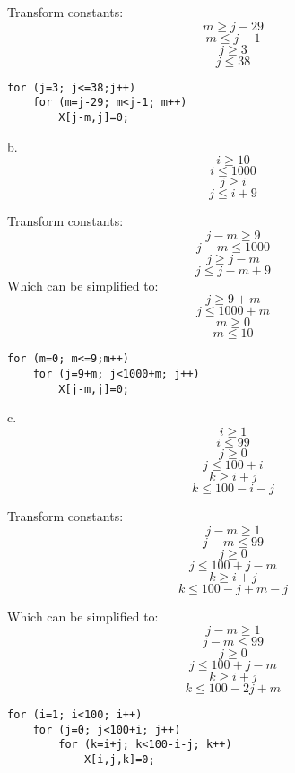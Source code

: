 \documentclass[11pt]{article}
\begin{document}
\begin{enumerate}
\begin{Answer}
		Transform constants:
		$$m \ge j - 29$$
		$$m \le j - 1$$
		$$j \ge 3$$
		$$j \le 38$$
\begin{verbatim}
for (j=3; j<=38;j++)
    for (m=j-29; m<j-1; m++)
        X[j-m,j]=0;
\end{verbatim}
		
		b.
		$$i \ge 10$$
		$$i \le 1000$$
		$$j \ge i$$
		$$j \le i + 9$$
		
		Transform constants:
		$$j - m \ge 9$$
		$$j - m \le 1000$$
		$$j \ge j - m$$
		$$j \le j - m + 9$$
		Which can be simplified to:
		$$j \ge 9 + m$$
		$$j \le 1000 + m$$
		$$m \ge 0$$
		$$m \le 10$$

\begin{verbatim}
for (m=0; m<=9;m++) 
    for (j=9+m; j<1000+m; j++)
        X[j-m,j]=0;
\end{verbatim}	
		c.
		$$i \ge 1$$
		$$i \le 99$$
		$$j \ge 0$$
		$$j \le 100 + i$$
		$$k \ge i + j$$
		$$k \le 100 - i - j$$
		
		Transform constants:
		$$j - m \ge 1$$
		$$j - m \le 99$$
		$$j \ge 0$$
		$$j \le 100 + j - m$$
		$$k \ge i + j$$
		$$k \le 100 - j + m - j$$
		
		Which can be simplified to:
		$$j - m \ge 1$$
		$$j - m \le 99$$
		$$j \ge 0$$
		$$j \le 100 + j - m$$
		$$k \ge i + j$$
		$$k \le 100 - 2j + m$$
		
\begin{verbatim}
for (i=1; i<100; i++)
    for (j=0; j<100+i; j++)
        for (k=i+j; k<100-i-j; k++) 
            X[i,j,k]=0;
\end{verbatim}
		\end{Answer}
\end{enumerate}
\end{document}
